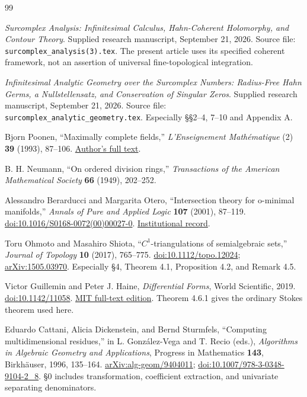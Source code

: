 \documentclass[11pt,letterpaper]{article}
\theoremstyle{definition}
\theoremstyle{remark}
\numberwithin{equation}{section}
\begin{document}
\begin{thebibliography}{99}

\emph{Surcomplex Analysis: Infinitesimal Calculus, Hahn-Coherent Holomorphy, and Contour Theory}.
Supplied research manuscript, September 21, 2026.
Source file: \texttt{surcomplex\_analysis(3).tex}.
The present article uses its specified coherent framework, not an assertion of universal fine-topological integration.

\emph{Infinitesimal Analytic Geometry over the Surcomplex Numbers: Radius-Free Hahn Germs, a Nullstellensatz, and Conservation of Singular Zeros}.
Supplied research manuscript, September 21, 2026.
Source file: \texttt{surcomplex\_analytic\_geometry.tex}.
Especially \S\S2--4, 7--10 and Appendix A.

Bjorn Poonen, ``Maximally complete fields,''
\emph{L'Enseignement Math\'ematique} (2) \textbf{39} (1993), 87--106.
\href{https://math.mit.edu/~poonen/papers/amsval.pdf}{Author's full text}.

B. H. Neumann, ``On ordered division rings,''
\emph{Transactions of the American Mathematical Society} \textbf{66} (1949), 202--252.

Alessandro Berarducci and Margarita Otero,
``Intersection theory for o-minimal manifolds,''
\emph{Annals of Pure and Applied Logic} \textbf{107} (2001), 87--119.
\href{https://doi.org/10.1016/S0168-0072(00)00027-0}{doi:10.1016/S0168-0072(00)00027-0}.
\href{https://arpi.unipi.it/handle/11568/186193}{Institutional record}.

Toru Ohmoto and Masahiro Shiota,
``$C^1$-triangulations of semialgebraic sets,''
\emph{Journal of Topology} \textbf{10} (2017), 765--775.
\href{https://doi.org/10.1112/topo.12024}{doi:10.1112/topo.12024};
\href{https://arxiv.org/abs/1505.03970}{arXiv:1505.03970}.
Especially \S4, Theorem 4.1, Proposition 4.2, and Remark 4.5.

Victor Guillemin and Peter J. Haine,
\emph{Differential Forms}, World Scientific, 2019.
\href{https://doi.org/10.1142/11058}{doi:10.1142/11058}.
\href{https://math.mit.edu/classes/18.952/2019SP/18.952_book_2019.pdf}{MIT full-text edition}.
Theorem 4.6.1 gives the ordinary Stokes theorem used here.

Eduardo Cattani, Alicia Dickenstein, and Bernd Sturmfels,
``Computing multidimensional residues,'' in
L. Gonz\'alez-Vega and T. Recio (eds.),
\emph{Algorithms in Algebraic Geometry and Applications},
Progress in Mathematics \textbf{143}, Birkh\"auser, 1996, 135--164.
\href{https://arxiv.org/abs/alg-geom/9404011}{arXiv:alg-geom/9404011};
\href{https://doi.org/10.1007/978-3-0348-9104-2_8}{doi:10.1007/978-3-0348-9104-2\_8}.
\S0 includes transformation, coefficient extraction, and univariate separating denominators.


\end{thebibliography}
\end{document}
